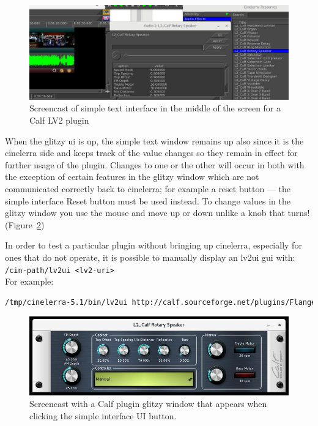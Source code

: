 \begin{figure}[htpb]
    \centering
    \includegraphics[width=0.9\linewidth]{images/calf.png}
    \caption{Screencast of simple text interface in the middle of the screen for a Calf LV2 plugin}
    \label{fig:calf}
\end{figure}

When the glitzy ui is up, the simple text window remains up also since it is the cinelerra side and keeps track of the value changes so they remain in effect for further usage of the plugin. Changes to one or the other will occur in both with the exception of certain features in the glitzy window which are not communicated correctly back to cinelerra; for example a reset button --- the simple interface Reset button must be used instead. To change values in the glitzy window you use the mouse and move up or down unlike a knob that turns! (Figure~\ref{fig:calf02})

In order to test a particular plugin without bringing up cinelerra, especially for ones that do not operate, it is possible to manually display an lv2ui gui with: \\
\texttt{/cin-path/lv2ui <lv2-uri>} \\
For example:

\begin{lstlisting}[language=Bash]
/tmp/cinelerra-5.1/bin/lv2ui http://calf.sourceforge.net/plugins/Flanger
\end{lstlisting}

\begin{figure}[htpb]
    \centering
    \includegraphics[width=0.8\linewidth]{images/calf02.png}
    \caption{Screencast with a Calf plugin glitzy window that appears when clicking the simple interface UI button.}
    \label{fig:calf02}
\end{figure}

